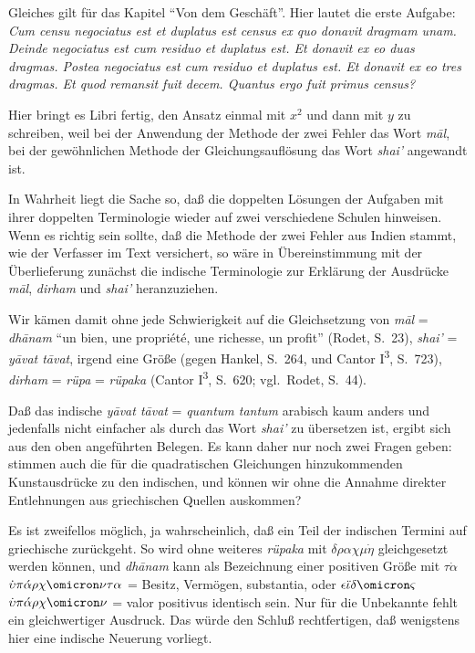 \documentclass[11pt,a4paper]{article}
\newcommand{\enquote}[1]{``#1''}
\begin{document}
Gleiches gilt f\"ur das Kapitel \enquote{Von dem Gesch\"aft}. Hier lautet die erste Aufgabe: \textit{Cum censu negociatus est et duplatus est census ex quo donavit dragmam unam. Deinde negociatus est cum residuo et duplatus est. Et donavit ex eo duas dragmas. Postea negociatus est cum residuo et duplatus est. Et donavit ex eo tres dragmas. Et quod remansit fuit decem. Quantus ergo fuit primus census?}

Hier bringt es Libri fertig, den Ansatz einmal mit $x^{2}$ und dann mit $y$ zu schreiben, weil bei der Anwendung der Methode der zwei Fehler das Wort \textit{m\=al}, bei der gew\"ohnlichen Methode der Gleichungsaufl\"osung das Wort \textit{shai'} angewandt ist.

In Wahrheit liegt die Sache so, da\ss{} die doppelten L\"osungen der Aufgaben mit ihrer doppelten Terminologie wieder auf zwei verschiedene Schulen hinweisen. Wenn es richtig sein sollte, da\ss{} die Methode der zwei Fehler aus Indien stammt, wie der Verfasser im Text versichert, so w\"are in \"Ubereinstimmung mit der \"Uberlieferung zun\"achst die indische Terminologie zur Erkl\"arung der Ausdr\"ucke \textit{m\=al}, \textit{dirham} und \textit{shai'} heranzuziehen.

Wir k\"amen damit ohne jede Schwierigkeit auf die Gleichsetzung von \textit{m\=al} = \textit{dh\=anam} \enquote{un bien, une propri\'et\'e, une richesse, un profit} (Rodet, S.\ 23), \textit{shai'} = \textit{y\=avat t\=avat}, irgend eine Gr\"o\ss{}e (gegen Hankel, S.\ 264, und Cantor I\textsuperscript{3}, S.\ 723), \textit{dirham} = \textit{r\"upa} = \textit{r\"upaka} (Cantor I\textsuperscript{3}, S.\ 620; vgl.\ Rodet, S.\ 44).

Da\ss{} das indische \textit{y\=avat t\=avat} = \textit{quantum tantum} arabisch kaum anders und jedenfalls nicht einfacher als durch das Wort \textit{shai'} zu \"ubersetzen ist, ergibt sich aus den oben angef\"uhrten Belegen. Es kann daher nur noch zwei Fragen geben: stimmen auch die f\"ur die quadratischen Gleichungen hinzukommenden Kunstausdr\"ucke zu den indischen, und k\"onnen wir ohne die Annahme direkter Entlehnungen aus griechischen Quellen auskommen?

Es ist zweifellos m\"oglich, ja wahrscheinlich, da\ss{} ein Teil der indischen Termini auf griechische zur\"uckgeht. So wird ohne weiteres \textit{r\"upaka} mit $\delta\rho\alpha\chi\mu\dot{\eta}$ gleichgesetzt werden k\"onnen, und \textit{dh\=anam} kann als Bezeichnung einer positiven Gr\"o\ss{}e mit $\tau\dot{\alpha}$ $\dot{\upsilon}\pi\acute{\alpha}\rho\chi\omicron\nu\tau\alpha$ = Besitz, Verm\"ogen, substantia, oder $\epsilon\ddot{\iota}\delta\omicron\varsigma$ $\dot{\upsilon}\pi\acute{\alpha}\rho\chi\omicron\nu$ = valor positivus identisch sein. Nur f\"ur die Unbekannte fehlt ein gleichwertiger Ausdruck. Das w\"urde den Schlu\ss{} rechtfertigen, da\ss{} wenigstens hier eine indische Neuerung vorliegt.
\end{document}
